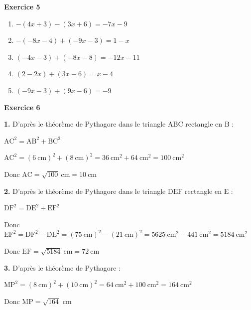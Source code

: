 \documentclass[12pt,a4paper,french]{article}
\begin{document}
\noindent\textbf{Exercice 5}\par
\smallskip
\begin{enumerate}
\item $-(4x + 3)-(3x + 6) = -7x - 9$
\item $-(-8x - 4)+(-9x - 3) = 1 - x$
\item $(-4x - 3)+(-8x - 8) = -12x - 11$
\item $(2 - 2x)+(3x - 6) = x - 4$
\item $(-9x - 3)+(9x - 6) = -9$
\end{enumerate}
\medskip

\noindent\textbf{Exercice 6}\par
\smallskip
\textbf{1.} D'après le théorème de Pythagore dans le triangle \ensuremath{\mathrm{A}}\ensuremath{\mathrm{B}}\ensuremath{\mathrm{C}} rectangle en \ensuremath{\mathrm{B}} :

$\ensuremath{\mathrm{A}}\ensuremath{\mathrm{C}}^2 = \ensuremath{\mathrm{A}}\ensuremath{\mathrm{B}}^2 + \ensuremath{\mathrm{B}}\ensuremath{\mathrm{C}}^2$

$\ensuremath{\mathrm{A}}\ensuremath{\mathrm{C}}^2 = (6~\text{cm})^2 + (8~\text{cm})^2 = 36~\text{cm}^2 + 64~\text{cm}^2 = 100~\text{cm}^2$

Donc $\ensuremath{\mathrm{A}}\ensuremath{\mathrm{C}} = \sqrt{100}~\text{cm} = 10~\text{cm}$

\medskip
\textbf{2.} D'après le théorème de Pythagore dans le triangle \ensuremath{\mathrm{D}}\ensuremath{\mathrm{E}}\ensuremath{\mathrm{F}} rectangle en \ensuremath{\mathrm{E}} :

$\ensuremath{\mathrm{D}}\ensuremath{\mathrm{F}}^2 = \ensuremath{\mathrm{D}}\ensuremath{\mathrm{E}}^2 + \ensuremath{\mathrm{E}}\ensuremath{\mathrm{F}}^2$

Donc $\ensuremath{\mathrm{E}}\ensuremath{\mathrm{F}}^2 = \ensuremath{\mathrm{D}}\ensuremath{\mathrm{F}}^2 - \ensuremath{\mathrm{D}}\ensuremath{\mathrm{E}}^2 = (75~\text{cm})^2 - (21~\text{cm})^2 = 5625~\text{cm}^2 - 441~\text{cm}^2 = 5184~\text{cm}^2$

Donc $\ensuremath{\mathrm{E}}\ensuremath{\mathrm{F}} = \sqrt{5184}~\text{cm} = 72~\text{cm}$

\medskip
\textbf{3.} D'après le théorème de Pythagore :

$\ensuremath{\mathrm{M}}\ensuremath{\mathrm{P}}^2 = (8~\text{cm})^2 + (10~\text{cm})^2 = 64~\text{cm}^2 + 100~\text{cm}^2 = 164~\text{cm}^2$

Donc $\ensuremath{\mathrm{M}}\ensuremath{\mathrm{P}} = \sqrt{164}$ cm
\end{document}

